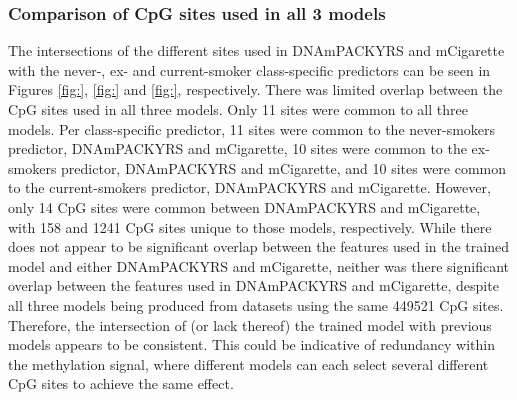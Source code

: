 \documentclass[draft]{article}
\begin{document}
\subsubsection{Comparison of CpG sites used in all 3 models} \label{sec:sites-comparison}
The intersections of the different sites used in DNAmPACKYRS and mCigarette with the never-, ex- and current-smoker class-specific predictors can be seen in Figures \ref{fig:}, \ref{fig:} and \ref{fig:}, respectively. There was limited overlap between the CpG sites used in all three models. Only 11 sites were common to all three models. Per class-specific predictor, 11 sites were common to the never-smokers predictor, DNAmPACKYRS and mCigarette, 10 sites were common to the ex-smokers predictor, DNAmPACKYRS and mCigarette, and 10 sites were common to the current-smokers predictor, DNAmPACKYRS and mCigarette. However, only 14 CpG sites were common between DNAmPACKYRS and mCigarette, with 158 and 1241 CpG sites unique to those models, respectively. While there does not appear to be significant overlap between the features used in the trained model and either DNAmPACKYRS and mCigarette, neither was there significant overlap between the features used in DNAmPACKYRS and mCigarette, despite all three models being produced from datasets using the same \num{449521} CpG sites. Therefore, the intersection of (or lack thereof) the trained model with previous models appears to be consistent. This could be indicative of redundancy within the methylation signal, where different models can each select several different CpG sites to achieve the same effect. 
\end{document}
